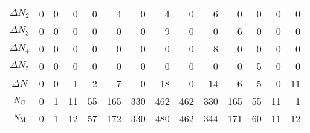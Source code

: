 \documentclass[12pt,a4paper]{article}
\begin{document}
\begin{table}
\begin{center}
\begin{tabular}{|c|r|r|r|r|r|r|r|r|r|r|r|r|r|}
$\Delta N_2$               & \phantom{$$}0          & 0 &  0                  &  0                  &   4                  &   0 &   4 &   0 &   6                  &   0                 &  0                  &  0 &  0                     \\
$\Delta N_3$               & \phantom{$$}0          & 0 &  0                  &  0                  &   0                  &   0 &   9 &   0 &   0                  &   6                 &  0                  &  0 &  0                     \\
$\Delta N_4$               & \phantom{$$}0          & 0 &  0                  &  0                  &   0                  &   0 &   0 &   0 &   8                  &   0                 &  0                  &  0 &  0                     \\
$\Delta N_5$               & \phantom{$$}0          & 0 &  0                  &  0                  &   0                  &   0 &   0 &   0 &   0                  &   0                 &  5                  &  0 &  0                     \\
$\Delta N$                 & \phantom{$$}0          & 0 &  1                  &  2                  &   7                  &   0 &  18 &   0 &  14                  &   6                 &  5                  &  0 & 11                     \\
$N_{\rm C}$                & \phantom{$$}0          & 1 & 11                  & 55                  & 165                  & 330 & 462 & 462 & 330                  & 165                 & 55                  & 11 &  1                     \\
$N_{\rm M}$                & \phantom{$$}0          & 1 & 12                  & 57                  & 172                  & 330 & 480 & 462 & 344                  & 171                 & 60                  & 11 & 12                     \\
\hline                            
\end{tabular}                     
\end{center}                      
\end{table}                       
%                                 
\end{document}
